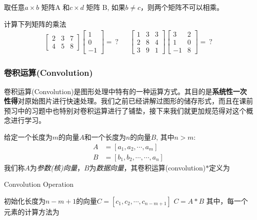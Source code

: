 \documentclass[12pt]{article}
\numberwithin{figure}{section}
\numberwithin{equation}{section}
\begin{document}
\begin{remark}
取任意$a \times b$ 矩阵A 和$c \times d$ 矩阵 B, 如果$b \neq c$，则两个矩阵不可以相乘。	
\end{remark}

\begin{example}
计算下列矩阵的乘法
\begin{align*}
	\begin{bmatrix}
		2 & 3 & 7 \\
		4 & 5 & 8 
	\end{bmatrix} \begin{bmatrix}
		1 \\
		0 \\
		-1 
	\end{bmatrix} = \ ? & & \begin{bmatrix}
		1 & 3 & 3 \\
		2 & 8 & 4 \\
		3 & 9 & 1 
	\end{bmatrix} \begin{bmatrix}
		3 & 2 \\
		1 & 0 \\
		-1 & 8 
	\end{bmatrix} = \ ?
\end{align*}	
\end{example}

\subsubsection{卷积运算(Convolution)}

卷积运算(Convolution)是图形处理中特有的一种运算方式。其目的是\textbf{系统性一次性得}对原始图片进行快速处理。我们之前已经讲解过图形的储存形式，而且在课前预习中的习题中也特别对卷积运算进行了铺垫，接下来我们就更加规范得对这个概念进行学习。

\begin{definition}
	给定一个长度为$m$的向量$A$和一个长度为$n$的向量$B$, 其中$n > m$:
	\begin{align*}
		A & = [a_1, a_2, \cdots, a_m ] \\
		B & = [b_1, b_2, \cdots, \cdots, a_n]
	\end{align*}
	我们称$A$为\textit{参数(核)向量}，$B$为\textit{数据向量}，其卷积运算(convolution)$*$定义为
	
	\begin{algorithm}[H]
	\SetAlgoLined
	\caption{Convolution Operation}
	初始化长度为$n-m+1$的向量$C = [c_1, c_2, \cdots, c_{n-m+1}]$ \;
	$C = A * B $ \; 其中，每一个元素的计算方法为\;
	\end{algorithm}
\end{definition}
\end{document}
